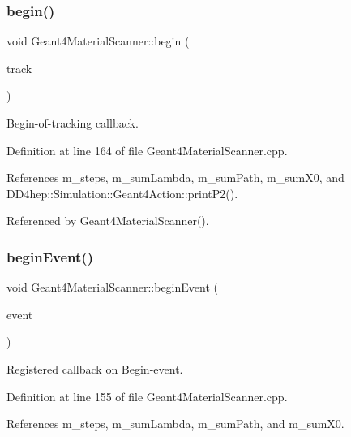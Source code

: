 \subsubsection{\texorpdfstring{begin()}{begin()}}
{\footnotesize\ttfamily void Geant4\+Material\+Scanner\+::begin (\begin{DoxyParamCaption}\item[{const G4\+Track $\ast$}]{track }\end{DoxyParamCaption})\hspace{0.3cm}{\ttfamily [virtual]}}



Begin-\/of-\/tracking callback. 



Definition at line 164 of file Geant4\+Material\+Scanner.\+cpp.



References m\+\_\+steps, m\+\_\+sum\+Lambda, m\+\_\+sum\+Path, m\+\_\+sum\+X0, and D\+D4hep\+::\+Simulation\+::\+Geant4\+Action\+::print\+P2().



Referenced by Geant4\+Material\+Scanner().

\hypertarget{class_d_d4hep_1_1_simulation_1_1_geant4_material_scanner_af8c21aaac99b7f654c98f83a3382c9f4}{}\label{class_d_d4hep_1_1_simulation_1_1_geant4_material_scanner_af8c21aaac99b7f654c98f83a3382c9f4} 
\subsubsection{\texorpdfstring{begin\+Event()}{beginEvent()}}
{\footnotesize\ttfamily void Geant4\+Material\+Scanner\+::begin\+Event (\begin{DoxyParamCaption}\item[{const G4\+Event $\ast$}]{event }\end{DoxyParamCaption})}



Registered callback on Begin-\/event. 



Definition at line 155 of file Geant4\+Material\+Scanner.\+cpp.



References m\+\_\+steps, m\+\_\+sum\+Lambda, m\+\_\+sum\+Path, and m\+\_\+sum\+X0.




